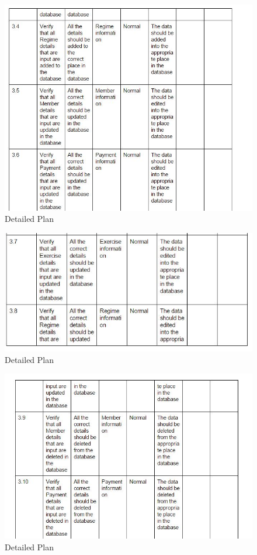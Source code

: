 \begin{itemize}
\begin{figure}[H]
    \includegraphics[width=\textwidth]{DP23.JPG}
    \caption{Detailed Plan} \label{fig:VDetailed Plan}
\end{figure}

\begin{figure}[H]
    \includegraphics[width=\textwidth]{DP24.JPG}
    \caption{Detailed Plan} \label{fig:VDetailed Plan}
\end{figure}

\begin{figure}[H]
    \includegraphics[width=\textwidth]{DP25.JPG}
    \caption{Detailed Plan} \label{fig:VDetailed Plan}
\end{figure}


\end{itemize}
